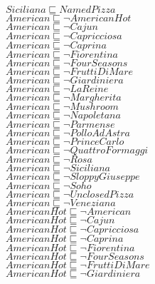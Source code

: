 \documentclass[a4paper,10pt]{article}
\begin{document}
 $Siciliana \sqsubseteq NamedPizza$\\ 
 $American \sqsubseteq  \lnot AmericanHot$\\ 
 $American \sqsubseteq  \lnot Cajun$\\ 
 $American \sqsubseteq  \lnot Capricciosa$\\ 
 $American \sqsubseteq  \lnot Caprina$\\ 
 $American \sqsubseteq  \lnot Fiorentina$\\ 
 $American \sqsubseteq  \lnot FourSeasons$\\ 
 $American \sqsubseteq  \lnot FruttiDiMare$\\ 
 $American \sqsubseteq  \lnot Giardiniera$\\ 
 $American \sqsubseteq  \lnot LaReine$\\ 
 $American \sqsubseteq  \lnot Margherita$\\ 
 $American \sqsubseteq  \lnot Mushroom$\\ 
 $American \sqsubseteq  \lnot Napoletana$\\ 
 $American \sqsubseteq  \lnot Parmense$\\ 
 $American \sqsubseteq  \lnot PolloAdAstra$\\ 
 $American \sqsubseteq  \lnot PrinceCarlo$\\ 
 $American \sqsubseteq  \lnot QuattroFormaggi$\\ 
 $American \sqsubseteq  \lnot Rosa$\\ 
 $American \sqsubseteq  \lnot Siciliana$\\ 
 $American \sqsubseteq  \lnot SloppyGiuseppe$\\ 
 $American \sqsubseteq  \lnot Soho$\\ 
 $American \sqsubseteq  \lnot UnclosedPizza$\\ 
 $American \sqsubseteq  \lnot Veneziana$\\ 
 $AmericanHot \sqsubseteq  \lnot American$\\ 
 $AmericanHot \sqsubseteq  \lnot Cajun$\\ 
 $AmericanHot \sqsubseteq  \lnot Capricciosa$\\ 
 $AmericanHot \sqsubseteq  \lnot Caprina$\\ 
 $AmericanHot \sqsubseteq  \lnot Fiorentina$\\ 
 $AmericanHot \sqsubseteq  \lnot FourSeasons$\\ 
 $AmericanHot \sqsubseteq  \lnot FruttiDiMare$\\ 
 $AmericanHot \sqsubseteq  \lnot Giardiniera$\\ 
\end{document}
